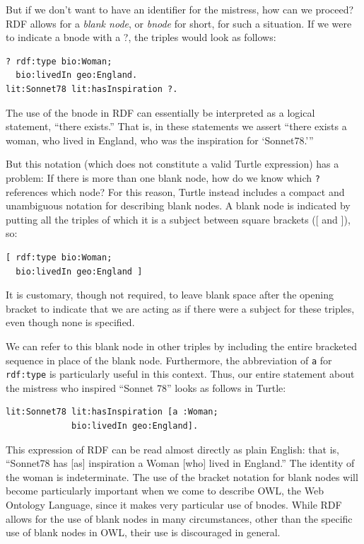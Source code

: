 But if we don't want to have an identifier for the mistress, how can we
proceed? RDF allows for a \emph{blank node}, or \emph{bnode} for short, for such a
situation. If we were to indicate a bnode with a ?, the triples would
look as follows:

\begin{lstlisting}
? rdf:type bio:Woman;
  bio:livedIn geo:England. 
lit:Sonnet78 lit:hasInspiration ?.
\end{lstlisting}

The use of the bnode in RDF can essentially be interpreted as a logical
statement, ``there exists.'' That is, in these statements we assert
``there exists a woman, who lived in England, who was the inspiration
for `Sonnet78.'''

But this notation (which does not constitute a valid Turtle expression)
has a problem: If there is
more than one blank node, how do we know which \texttt{?} references which
node? For this reason, Turtle instead includes a compact and unambiguous
notation for describing blank nodes. A blank node is indicated by
putting all the triples of which it is a subject between square brackets
({[} and {]}), so:

\begin{lstlisting}
[ rdf:type bio:Woman;
  bio:livedIn geo:England ]
\end{lstlisting}

It is customary, though not required, to leave blank space after the
opening bracket to indicate that we are acting as if there were a
subject for these triples, even though none is specified.

We can refer to this blank node in other triples by including the entire
bracketed sequence in place of the blank node. Furthermore, the
abbreviation of \texttt{a} for \texttt{rdf:type} is particularly useful in this
context. Thus, our entire statement about the mistress who inspired
``Sonnet 78'' looks as follows in Turtle:

\begin{lstlisting}
lit:Sonnet78 lit:hasInspiration [a :Woman;
             bio:livedIn geo:England].
\end{lstlisting}

This expression of RDF can be read almost directly as plain English:
that is, ``Sonnet78 has {[}as{]} inspiration a Woman {[}who{]} lived in
England.'' The identity of the woman is indeterminate. The use of the
bracket notation for blank nodes will become particularly important when
we come to describe OWL, the Web Ontology Language, since it makes very
particular use of bnodes. While RDF allows for the use of blank nodes in
many circumstances, other than the specific use of blank nodes in OWL,
their use is discouraged in general.


